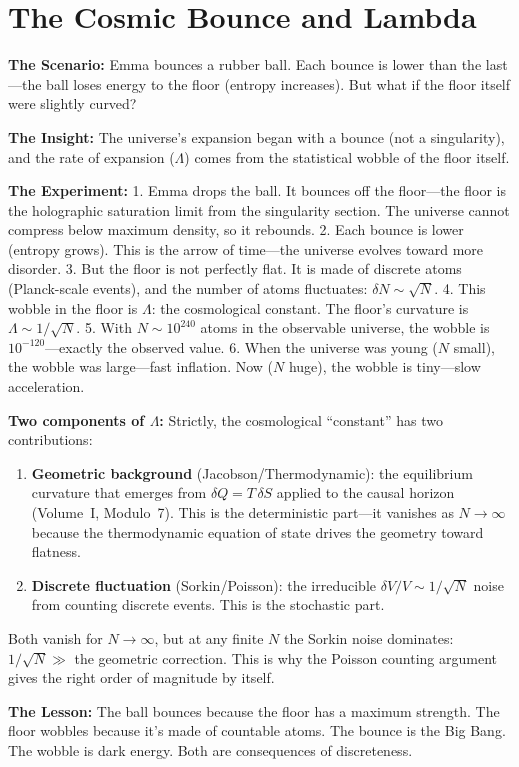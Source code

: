 \documentclass[11pt, a4paper, openany]{book}
\begin{document}
\section{The Cosmic Bounce and Lambda}
\begin{thoughtexp}
\textbf{The Scenario:} Emma bounces a rubber ball. Each bounce is lower than the last---the ball loses energy to the floor (entropy increases). But what if the floor itself were slightly curved?

\textbf{The Insight:} The universe's expansion began with a bounce (not a singularity), and the rate of expansion ($\Lambda$) comes from the statistical wobble of the floor itself.

\textbf{The Experiment:}
1. Emma drops the ball. It bounces off the floor---the floor is the holographic saturation limit from the singularity section. The universe cannot compress below maximum density, so it rebounds.
2. Each bounce is lower (entropy grows). This is the arrow of time---the universe evolves toward more disorder.
3. But the floor is not perfectly flat. It is made of discrete atoms (Planck-scale events), and the number of atoms fluctuates: $\delta N \sim \sqrt{N}$.
4. This wobble in the floor is $\Lambda$: the cosmological constant. The floor's curvature is $\Lambda \sim 1/\sqrt{N}$.
5. With $N \sim 10^{240}$ atoms in the observable universe, the wobble is $10^{-120}$---exactly the observed value.
6. When the universe was young ($N$ small), the wobble was large---fast inflation. Now ($N$ huge), the wobble is tiny---slow acceleration.

\textbf{Two components of $\Lambda$:} Strictly, the cosmological ``constant'' has two contributions:
\begin{enumerate}
  \item \textbf{Geometric background} (Jacobson/Thermodynamic): the equilibrium curvature that emerges from $\delta Q = T\,\delta S$ applied to the causal horizon (Volume~I, Modulo~7). This is the deterministic part---it vanishes as $N \to \infty$ because the thermodynamic equation of state drives the geometry toward flatness.
  \item \textbf{Discrete fluctuation} (Sorkin/Poisson): the irreducible $\delta V / V \sim 1/\sqrt{N}$ noise from counting discrete events. This is the stochastic part.
\end{enumerate}
Both vanish for $N \to \infty$, but at any finite $N$ the Sorkin noise dominates: $1/\sqrt{N} \gg$ the geometric correction. This is why the Poisson counting argument gives the right order of magnitude by itself.

\textbf{The Lesson:} The ball bounces because the floor has a maximum strength. The floor wobbles because it's made of countable atoms. The bounce is the Big Bang. The wobble is dark energy. Both are consequences of discreteness.
\end{thoughtexp}
\end{document}
